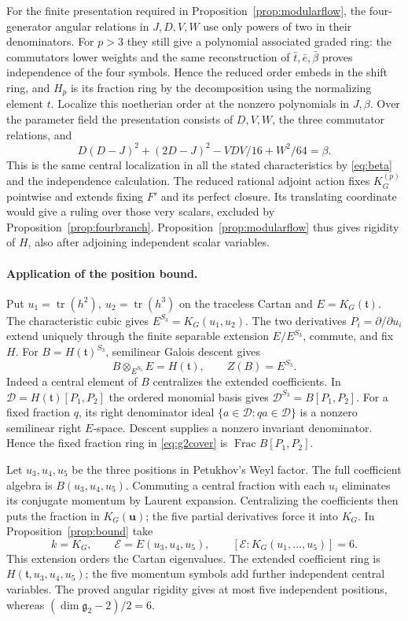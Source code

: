 \documentclass[11pt,a4paper]{article}
\theoremstyle{definition}
\begin{document}
For the finite presentation required in Proposition~\ref{prop:modularflow}, the four-generator angular relations in \(J,D,V,W\) use only powers of two in their denominators. For \(p>3\) they still give a polynomial associated graded ring: the commutators lower weights and the same reconstruction of \(\bar t,\bar e,\bar\beta\) proves independence of the four symbols. Hence the reduced order embeds in the shift ring, and \(H_p\) is its fraction ring by the decomposition using the normalizing element \(t\). Localize this noetherian order at the nonzero polynomials in \(J,\beta\). Over the parameter field the presentation consists of \(D,V,W\), the three commutator relations, and
\[
 D(D-J)^2+(2D-J)^2-VDV/16+W^2/64=\beta.
\]
This is the same central localization in all the stated characteristics by \eqref{eq:beta} and the independence calculation. The reduced rational adjoint action fixes \(K_G^{(p)}\) pointwise and extends fixing \(F'\) and its perfect closure. Its translating coordinate would give a ruling over those very scalars, excluded by Proposition~\ref{prop:fourbranch}. Proposition~\ref{prop:modularflow} thus gives rigidity of \(H\), also after adjoining independent scalar variables.

\paragraph{Application of the position bound.}\label{sec:g2apply}
Put \(u_1=\operatorname{tr}(h^2),\ u_2=\operatorname{tr}(h^3)\) on the traceless Cartan and \(E=K_G(\mathfrak t)\). The characteristic cubic gives \(E^{S_3}=K_G(u_1,u_2)\). The two derivatives \(P_i=\partial/\partial u_i\) extend uniquely through the finite separable extension \(E/E^{S_3}\), commute, and fix \(H\).
For \(B=H(\mathfrak t)^{S_3}\), semilinear Galois descent gives
\[
 B\otimes_{E^{S_3}}E=H(\mathfrak t),\qquad Z(B)=E^{S_3}.
\]
Indeed a central element of \(B\) centralizes the extended coefficients. In \(\mathcal D=H(\mathfrak t)[P_1,P_2]\) the ordered monomial basis gives \(\mathcal D^{S_3}=B[P_1,P_2]\). For a fixed fraction \(q\), its right denominator ideal \(\{a\in\mathcal D:qa\in\mathcal D\}\) is a nonzero semilinear right \(E\)-space. Descent supplies a nonzero invariant denominator. Hence the fixed fraction ring in \eqref{eq:g2cover} is \(\operatorname{Frac}B[P_1,P_2]\).

Let \(u_3,u_4,u_5\) be the three positions in Petukhov's Weyl factor. The full coefficient algebra is \(B(u_3,u_4,u_5)\). Commuting a central fraction with each \(u_i\) eliminates its conjugate momentum by Laurent expansion. Centralizing the coefficients then puts the fraction in \(K_G(\mathbf u)\); the five partial derivatives force it into \(K_G\). In Proposition~\ref{prop:bound} take
\[
 k=K_G,\qquad \mathcal E=E(u_3,u_4,u_5),\qquad
 [\mathcal E:K_G(u_1,\ldots,u_5)]=6.
\]
This extension orders the Cartan eigenvalues. The extended coefficient ring is \(H(\mathfrak t,u_3,u_4,u_5)\); the five momentum symbols add further independent central variables. The proved angular rigidity gives at most five independent positions, whereas \((\dim\mathfrak g_2-2)/2=6\).
\end{document}
